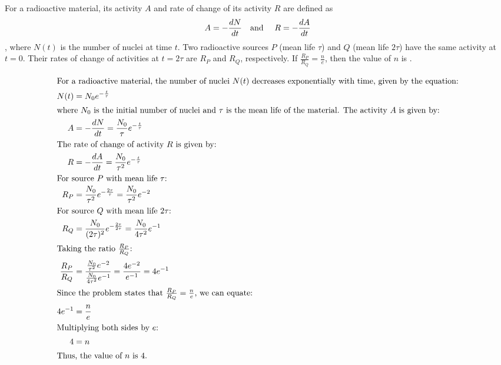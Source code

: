 
\item For a radioactive material, its activity $A$ and rate of change of its activity $R$ are defined as \[A = -\frac{dN}{dt} \text{\quad and \quad} R = -\frac{dA}{dt}\], where $N(t)$ is the number of nuclei at time $t$. Two radioactive sources $P$ (mean life $\tau$) and $Q$ (mean life $2\tau$) have the same activity at $t = 0$. Their rates of change of activities at $t = 2\tau$ are $R_P$ and $R_Q$, respectively. If $\frac{R_P}{R_Q} = \frac{n}{e}$, then the value of $n$ is \underline{\hspace{2.5 cm}}.
\begin{solution}
    \begin{align*}
        \intertext{For a radioactive material, the number of nuclei $N(t)$ decreases exponentially with time, given by the equation:}
        N(t) &= N_0 e^{-\frac{t}{\tau}} \\
        \intertext{where $N_0$ is the initial number of nuclei and $\tau$ is the mean life of the material. The activity $A$ is given by:}
        A &= -\frac{dN}{dt} = \frac{N_0}{\tau}e^{-\frac{t}{\tau}} \\
        \intertext{The rate of change of activity $R$ is given by:}
        R &= -\frac{dA}{dt} = \frac{N_0}{\tau^2}e^{-\frac{t}{\tau}} \\
        \intertext{For source $P$ with mean life $\tau$:}
        R_P &= \frac{N_0}{\tau^2}e^{-\frac{2\tau}{\tau}} = \frac{N_0}{\tau^2}e^{-2} \\
        \intertext{For source $Q$ with mean life $2\tau$:}
        R_Q &= \frac{N_0}{(2\tau)^2}e^{-\frac{2\tau}{2\tau}} = \frac{N_0}{4\tau^2}e^{-1} \\
        \intertext{Taking the ratio $\frac{R_P}{R_Q}$:}
        \frac{R_P}{R_Q} &= \frac{\frac{N_0}{\tau^2}e^{-2}}{\frac{N_0}{4\tau^2}e^{-1}} = \frac{4e^{-2}}{e^{-1}} = 4e^{-1} \\
        \intertext{Since the problem states that $\frac{R_P}{R_Q} = \frac{n}{e}$, we can equate:}
        4e^{-1} &= \frac{n}{e} \\
        \intertext{Multiplying both sides by $e$:}
        4 &= n \\
        \intertext{Thus, the value of $n$ is $4$.}
    \end{align*}
\end{solution}